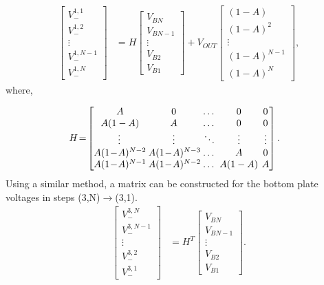 \documentclass[conference]{IEEEtran}
\begin{document}
	\begin{equation}
	\begin{split}
	\begin{bmatrix}
	V_-^{1,1} \\
	V_-^{1,2} \\
	\vdots\\
	V_-^{1,N-1} \\ 
	V_-^{1,N}
	\end{bmatrix}
	&\!=\!
	H\!\begin{bmatrix}
	V_{BN} \\
	V_{BN-1} \\
	\vdots \\
	V_{B2} \\
	V_{B1}
	\end{bmatrix}\!+\!V_{OUT}\!\begin{bmatrix}
	(1-A) \\
	(1-A)^2 \\
	\vdots \\
	(1\!-\!A)^{N-1} \\
	(1\!-\!A)^N
	\end{bmatrix}\!,
	\end{split}
	\label{eq:V_1}
	\end{equation}
	where,
	
	\begin{equation}
	\begin{split}
	H
	&\!=\!
	\arraycolsep2pt 
	\begin{bmatrix}
	A \!& 0 & \dots & 0 & 0 \\
	A(1-A) \!& A & \dots & 0 & 0\\
	\vdots & \vdots & \ddots & \vdots & \vdots \\
	A(1\!-\!A)^{N-2} \!& A(1\!-\!A)^{N-3} \!& \dots & A & 0\\ 
	A(1\!-\!A)^{N-1} \!& A(1\!-\!A)^{N-2} \!& \dots & A(1-A) & A 
	\end{bmatrix}.\!
	\end{split}
	\label{eq:M}
	\end{equation}
	Using a similar method, a matrix can be constructed for the bottom plate voltages in steps (3,N)$\rightarrow$(3,1).
	\begin{equation}
	\begin{split}
	\begin{bmatrix}
		V_-^{3,N} \\
		V_-^{3,N-1} \\
		\vdots\\
		V_-^{3,2} \\ 
		V_-^{3,1}
		\end{bmatrix}
		&\!=\!
		H^T\!\begin{bmatrix}
		V_{BN} \\
		V_{BN-1} \\
		\vdots \\
		V_{B2} \\
		V_{B1}
		\end{bmatrix}.
		\end{split}
		\label{eq:V_3}
		\end{equation}
	
\end{document}
